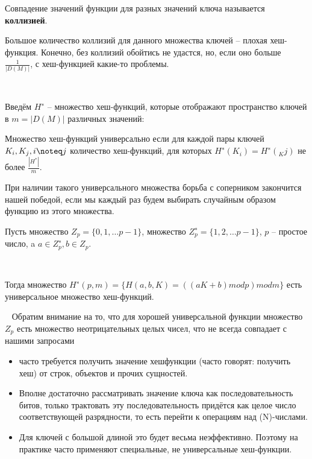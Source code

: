 \documentclass{beamer}
\begin{document}
\begin{frame}[t]
    Совпадение значений функции для разных значений ключа называется \textbf{коллизией}. 

    Большое количество коллизий для данного множества ключей -- плохая хеш-функция. Конечно, без коллизий обойтись не удастся, но, если
оно больше $\frac{1}{|D(M)|}$, с хеш-функцией какие-то проблемы.

    ~
    
    Введём $H^{∗}$ -- множество хеш-функций, которые отображают пространство ключей в $m = |D(M)|$ различных значений:

    \begin{block}{Множество хеш-функций универсально}
        если для каждой пары ключей $K_i, K_j, i \noteq j$ количество хеш-функций, для которых $H^{∗}(K_i) = H^{∗}(_Kj)$ не более
        $\frac{|H^{*}|}{m}. $
    \end{block}
	При наличии такого универсального множества борьба с соперником закончится нашей победой, если мы каждый раз будем выбирать случайным образом функцию из этого множества. 
\end{frame}

\begin{frame}[t]
    Пусть множество $Z_p = \{0,1,\dots p−1\}$, множество $Z^{∗}_p = \{1,2,\dots p-1\}$, $p$ -- простое число, a $a\in Z_p^{∗}, b\in Z_p$. 
    
    ~
    
    Тогда множество $H^{∗}(p,m) = \{H(a,b,K)=((aK+b) mod p) mod m\}$ есть универсальное множество хеш-функций.

    ~ Обратим внимание на то, что для хорошей универсальной функции множество $Z_p$ есть множество неотрицательных целых чисел, что не всегда совпадает с нашими запросами
    \begin{itemize}
        \item часто требуется получить значение хешфункции (часто говорят: получить хеш) от строк, объектов и прочих сущностей. 
        \item Вполне достаточно рассматривать значение ключа как последовательность битов, только трактовать эту последовательность придётся как целое число соответствующей разрядности, то есть перейти к операциям над (N)-числами. 
        \item Для ключей с большой длиной это будет весьма неэффективно. Поэтому на практике часто применяют специальные, не универсальные хеш-функции.
    \end{itemize}
\end{frame}
\end{document}
